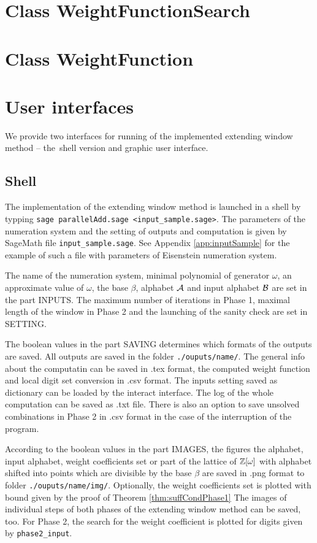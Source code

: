 \section{Class WeightFunctionSearch}



\section{Class WeightFunction}


\section{User interfaces}
We provide two interfaces for running of the implemented extending window method -- the~shell version and graphic user interface.

\subsection{Shell}
The implementation of the extending window method is launched in a shell by typping \verb+sage parallelAdd.sage <input_sample.sage>+. The parameters of the numeration system and the setting of outputs and computation is given by SageMath file \verb+input_sample.sage+. See Appendix \ref{app:inputSample} for the example of such a file with parameters of Eisenstein numeration system.

The name of the numeration system, minimal polynomial of generator $\omega$, an approximate value of $\omega$, the base $\beta$, alphabet $\mathcal{A}$ and input alphabet $\mathcal{B}$ are set in the part INPUTS. The maximum number of iterations in Phase 1, maximal length of the window in Phase 2 and the launching of the sanity check are set in SETTING. 

The boolean values in the part SAVING determines which formats of the outputs are saved. All outputs are saved in the folder \verb+./ouputs/name/+. The general info about the computatin can be saved in .tex format, the computed weight function and local digit set conversion in .csv format. The inputs setting saved as dictionary can be loaded by the interact interface. The log of the whole computation can be saved as .txt file. There is also an option to save unsolved combinations in Phase 2 in .csv format in the case of the interruption of the program.

According to the boolean values in the part IMAGES, the figures the alphabet, input alphabet, weight coefficients set or part of the lattice of $\mathbb{Z}[\omega]$ with alphabet shifted into points which are divisible by the base $\beta$ are saved in .png format to folder \verb+./ouputs/name/img/+. Optionally, the weight coefficients set is plotted with bound given by the proof of Theorem \ref{thm:suffCondPhase1} The images of individual steps of both phases of the extending window method can be saved, too. For Phase 2, the search for the weight coefficient  is plotted for digits given by \verb+phase2_input+.  

